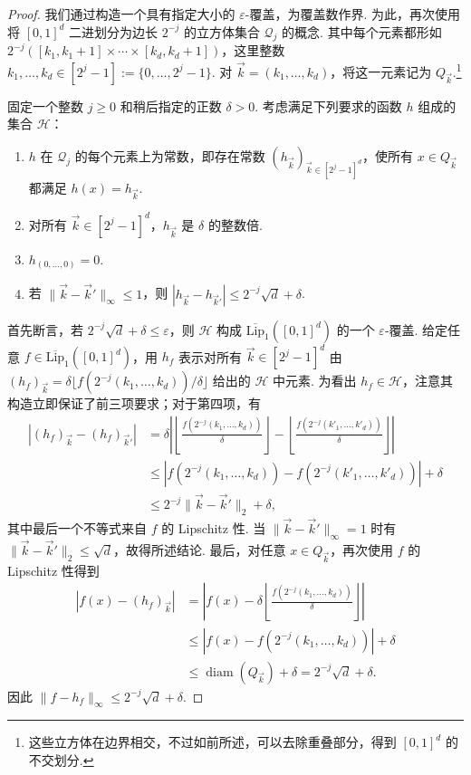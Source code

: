 \begin{proof}
我们通过构造一个具有指定大小的 $\varepsilon$-覆盖，为覆盖数作界. 为此，再次使用将 $[0,1]^d$ 二进划分为边长 $2^{-j}$ 的立方体集合 $\mathcal Q_j$ 的概念. 其中每个元素都形如 $2^{-j}([k_1,k_1+1]\times\cdots\times[k_d,k_d+1])$，这里整数 $k_1,\ldots,k_d\in[2^j-1]:=\{0,\ldots,2^j-1\}$. 对 $\vec k=(k_1,\ldots,k_d)$，将这一元素记为 $Q_{\vec k}$.\footnote{这些立方体在边界相交，不过如前所述，可以去除重叠部分，得到 $[0,1]^d$ 的不交划分.}

固定一个整数 $j\ge0$ 和稍后指定的正数 $\delta>0$. 考虑满足下列要求的函数 $h$ 组成的集合 $\mathcal H$：
\begin{enumerate}
\item $h$ 在 $\mathcal Q_j$ 的每个元素上为常数，即存在常数 $(h_{\vec k})_{\vec k\in[2^j-1]^d}$，使所有 $x\in Q_{\vec k}$ 都满足 $h(x)=h_{\vec k}$.
\item 对所有 $\vec k\in[2^j-1]^d$，$h_{\vec k}$ 是 $\delta$ 的整数倍.
\item $h_{(0,\ldots,0)}=0$.
\item 若 $\lVert\vec k-\vec k'\rVert_\infty\le1$，则 $|h_{\vec k}-h_{\vec k'}|\le2^{-j}\sqrt d+\delta$.
\end{enumerate}
首先断言，若 $2^{-j}\sqrt d+\delta\le\varepsilon$，则 $\mathcal H$ 构成 $\overline{\mathrm{Lip}}_1([0,1]^d)$ 的一个 $\varepsilon$-覆盖. 给定任意 $f\in\overline{\mathrm{Lip}}_1([0,1]^d)$，用 $h_f$ 表示对所有 $\vec k\in[2^j-1]^d$ 由 $(h_f)_{\vec k}=\delta\lfloor f(2^{-j}(k_1,\ldots,k_d))/\delta\rfloor$ 给出的 $\mathcal H$ 中元素. 为看出 $h_f\in\mathcal H$，注意其构造立即保证了前三项要求；对于第四项，有
$$\begin{aligned}
|(h_f)_{\vec k}-(h_f)_{\vec k'}|
&=\delta\left|\left\lfloor\frac{f(2^{-j}(k_1,\ldots,k_d))}{\delta}\right\rfloor
-\left\lfloor\frac{f(2^{-j}(k'_1,\ldots,k'_d))}{\delta}\right\rfloor\right|\\
&\le|f(2^{-j}(k_1,\ldots,k_d))-f(2^{-j}(k'_1,\ldots,k'_d))|+\delta\\
&\le2^{-j}\lVert\vec k-\vec k'\rVert_2+\delta,
\end{aligned}$$
其中最后一个不等式来自 $f$ 的 Lipschitz 性. 当 $\lVert\vec k-\vec k'\rVert_\infty=1$ 时有 $\lVert\vec k-\vec k'\rVert_2\le\sqrt d$，故得所述结论. 最后，对任意 $x\in Q_{\vec k}$，再次使用 $f$ 的 Lipschitz 性得到
$$\begin{aligned}
|f(x)-(h_f)_{\vec k}|
&=\left|f(x)-\delta\left\lfloor\frac{f(2^{-j}(k_1,\ldots,k_d))}{\delta}\right\rfloor\right|\\
&\le|f(x)-f(2^{-j}(k_1,\ldots,k_d))|+\delta\\
&\le\operatorname{diam}(Q_{\vec k})+\delta=2^{-j}\sqrt d+\delta.
\end{aligned}$$
因此 $\lVert f-h_f\rVert_\infty\le2^{-j}\sqrt d+\delta$.


\end{proof}
